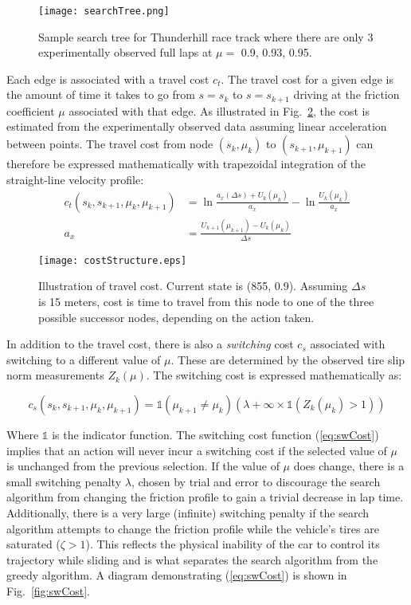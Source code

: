 {{{ \newpage
  \begin{figure}[h!]
\centering
\texttt{[image: searchTree.png]}
\caption{Sample search tree for Thunderhill race track where there are only 3 experimentally observed full laps at $\mu =$ 0.9, 0.93, 0.95.}
\label{fig:stree}
\end{figure} 
\newpage
 
Each edge is associated with a travel cost $c_t$. The travel cost for a given edge is the amount of time it takes to go from
$s = s_k$ to $s = s_{k+1}$ driving at the friction coefficient $\mu$ associated with that edge. As illustrated in Fig.~\ref{fig:costDiag}, the cost is estimated from the experimentally
observed data assuming linear acceleration between points. The travel cost from node $(s_k, \mu_k)$ to $(s_{k+1}, \mu_{k+1})$ can therefore be expressed mathematically with trapezoidal integration of the straight-line velocity profile:
\begin{align}
c_t(s_k, s_{k+1},\mu_k, \mu_{k+1}) &= \ln \frac{a_x(\Delta s) + U_k(\mu_k)}{a_x} - \ln \frac{U_k(\mu_k)}{a_x} \\
a_x &= \frac{U_{k+1}(\mu_{k+1}) - U_k(\mu_k)}{\Delta s}
\end{align}

 \begin{figure}[tb]
\centering
\texttt{[image: costStructure.eps]}
\caption[Illustration of travel cost.]{Illustration of travel cost. Current state is (855, 0.9). Assuming $\Delta s$ is 15 meters, cost is time to travel from this node
to one of the three possible successor nodes, depending on the action taken.}
\label{fig:costDiag}
\end{figure} 
\newpage
In addition to the travel cost, there is also a \textit{switching} cost $c_s$ associated with switching to a different value of $\mu$. These
are determined by the observed tire slip norm measurements $Z_k(\mu)$. The switching cost is expressed mathematically as:

\begin{equation}
\label{eq:swCost}
c_s(s_k, s_{k+1},\mu_k, \mu_{k+1}) =\mathds{1}\left(\mu_{k+1} \neq \mu_{k}\right)\left(\lambda  + \infty \times\mathds{1}\left(Z_k(\mu_k) > 1\right) \right)
\end{equation}

Where $\mathds{1}$ is the indicator function. The switching cost function (\ref{eq:swCost}) implies that an action will never
incur a switching cost if the selected value of $\mu$ is unchanged from the previous selection. If the value of $\mu$ does change, there
is a small switching penalty $\lambda$, chosen by trial and error to discourage the search algorithm from changing the friction profile to gain a
trivial decrease in lap time. Additionally, there is a very large (infinite) switching penalty if the search algorithm attempts to change the
friction profile while the vehicle's tires are saturated ($\zeta > 1$). This reflects the physical inability of the car to control its
trajectory while sliding and is what separates the search algorithm from the greedy algorithm. A diagram demonstrating (\ref{eq:swCost})
is shown in Fig.~\ref{fig:swCost}. 

}}}
